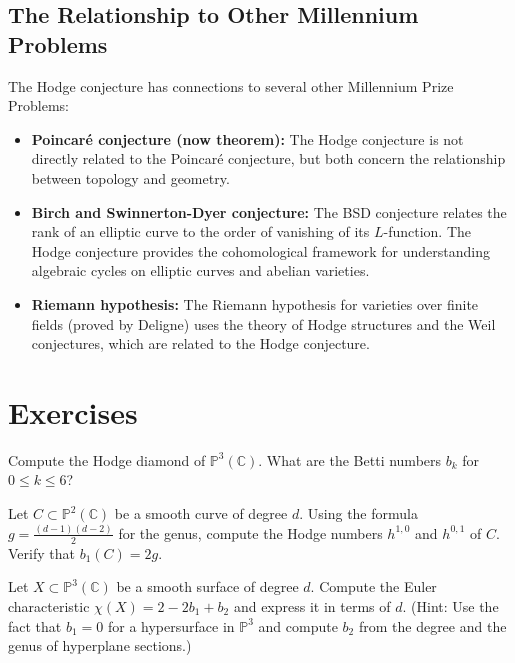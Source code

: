 \subsection{The Relationship to Other Millennium Problems}

The Hodge conjecture has connections to several other Millennium Prize Problems:

\begin{itemize}
\item \textbf{Poincar\'{e} conjecture (now theorem):} The Hodge conjecture is not directly related to the Poincar\'{e} conjecture, but both concern the relationship between topology and geometry.
\item \textbf{Birch and Swinnerton-Dyer conjecture:} The BSD conjecture relates the rank of an elliptic curve to the order of vanishing of its $L$-function. The Hodge conjecture provides the cohomological framework for understanding algebraic cycles on elliptic curves and abelian varieties.
\item \textbf{Riemann hypothesis:} The Riemann hypothesis for varieties over finite fields (proved by Deligne) uses the theory of Hodge structures and the Weil conjectures, which are related to the Hodge conjecture.
\end{itemize}

\section{Exercises}

\begin{exercise}
Compute the Hodge diamond of $\mathbb{P}^3(\mathbb{C})$. What are the Betti numbers $b_k$ for $0 \le k \le 6$?
\end{exercise}

\begin{exercise}
Let $C \subset \mathbb{P}^2(\mathbb{C})$ be a smooth curve of degree $d$. Using the formula $g = \frac{(d-1)(d-2)}{2}$ for the genus, compute the Hodge numbers $h^{1,0}$ and $h^{0,1}$ of $C$. Verify that $b_1(C) = 2g$.
\end{exercise}

\begin{exercise}
Let $X \subset \mathbb{P}^3(\mathbb{C})$ be a smooth surface of degree $d$. Compute the Euler characteristic $\chi(X) = 2 - 2b_1 + b_2$ and express it in terms of $d$. (Hint: Use the fact that $b_1 = 0$ for a hypersurface in $\mathbb{P}^3$ and compute $b_2$ from the degree and the genus of hyperplane sections.)
\end{exercise}

